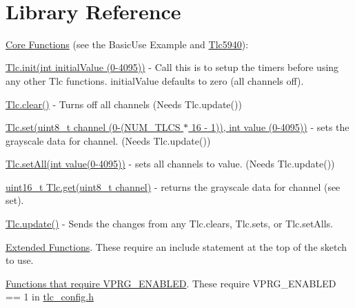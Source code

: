 ~\hypertarget{index_libref}{}\section{Library Reference}\label{index_libref}
\hyperlink{group__CoreFunctions}{Core Functions} (see the Basic\+Use Example and \hyperlink{classTlc5940}{Tlc5940})\+:
\begin{DoxyItemize}
\item \hyperlink{group__CoreFunctions_gaa42fdda37a43a13f49b00924d93eedd4}{Tlc.\+init(int initial\+Value (0-\/4095))} -\/ Call this is to setup the timers before using any other Tlc functions. initial\+Value defaults to zero (all channels off).
\item \hyperlink{group__CoreFunctions_ga5e5acd62f0c91579694ed4cffd88bd76}{Tlc.\+clear()} -\/ Turns off all channels (Needs Tlc.\+update())
\item \hyperlink{group__CoreFunctions_ga3d487c503365fa5b948b6711b9dac73e}{Tlc.\+set(uint8\+\_\+t channel (0-\/(N\+U\+M\+\_\+\+T\+L\+CS $\ast$ 16 -\/ 1)), int value (0-\/4095))} -\/ sets the grayscale data for channel. (Needs Tlc.\+update())
\item \hyperlink{group__CoreFunctions_gacb63767b2063823e9c5d0e1d8db77ceb}{Tlc.\+set\+All(int value(0-\/4095))} -\/ sets all channels to value. (Needs Tlc.\+update())
\item \hyperlink{group__CoreFunctions_gac712fcd944dd3f5f4f0ff158d754ea06}{uint16\+\_\+t Tlc.\+get(uint8\+\_\+t channel)} -\/ returns the grayscale data for channel (see set).
\item \hyperlink{group__CoreFunctions_ga18ee51310250855d75cff715a5ff4d48}{Tlc.\+update()} -\/ Sends the changes from any Tlc.\+clear\textquotesingle{}s, Tlc.\+set\textquotesingle{}s, or Tlc.\+set\+All\textquotesingle{}s.
\end{DoxyItemize}

\hyperlink{group__ExtendedFunctions}{Extended Functions}. These require an include statement at the top of the sketch to use.

\hyperlink{group__ReqVPRG__ENABLED}{Functions that require V\+P\+R\+G\+\_\+\+E\+N\+A\+B\+L\+ED}. These require V\+P\+R\+G\+\_\+\+E\+N\+A\+B\+L\+ED == 1 in \hyperlink{tlc__config_8h}{tlc\+\_\+config.\+h}

